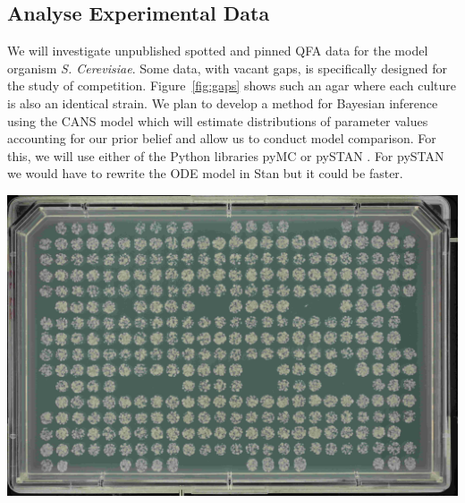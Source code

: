 \subsection{Analyse Experimental Data}
\label{sec:analyse-data}


We will investigate unpublished spotted and pinned QFA data for the
model organism \textit{S. Cerevisiae}. Some data, with vacant gaps, is
specifically designed for the study of
competition. Figure~\ref{fig:gaps} shows such an agar where each
culture is also an identical strain. We plan to develop a method for
Bayesian inference using the CANS model which will estimate
distributions of parameter values accounting for our prior belief and
allow us to conduct model comparison. For this, we will use either of
the Python libraries pyMC \citep{PyMC2010} or pySTAN \citep{Stan}. For
pySTAN we would have to rewrite the ODE model in Stan but it
could be faster.

\begin{Figure}
  \centering
  \includegraphics[width=\linewidth]{DLR00012647-2009-07-02_23-12-49}
  \label{fig:gaps}
\end{Figure}


